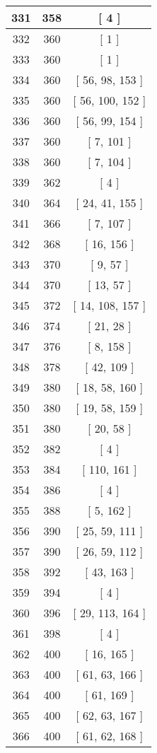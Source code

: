 \begin{center}
\begin{longtable}[H]{|| c c c ||}
331 & 358 & [ 4 ]
\\\hline
332 & 360 & [ 1 ]
\\\hline
333 & 360 & [ 1 ]
\\\hline
334 & 360 & [ 56, 98, 153 ]
\\\hline
335 & 360 & [ 56, 100, 152 ]
\\\hline
336 & 360 & [ 56, 99, 154 ]
\\\hline
337 & 360 & [ 7, 101 ]
\\\hline
338 & 360 & [ 7, 104 ]
\\\hline
339 & 362 & [ 4 ]
\\\hline
340 & 364 & [ 24, 41, 155 ]
\\\hline
341 & 366 & [ 7, 107 ]
\\\hline
342 & 368 & [ 16, 156 ]
\\\hline
343 & 370 & [ 9, 57 ]
\\\hline
344 & 370 & [ 13, 57 ]
\\\hline
345 & 372 & [ 14, 108, 157 ]
\\\hline
346 & 374 & [ 21, 28 ]
\\\hline
347 & 376 & [ 8, 158 ]
\\\hline
348 & 378 & [ 42, 109 ]
\\\hline
349 & 380 & [ 18, 58, 160 ]
\\\hline
350 & 380 & [ 19, 58, 159 ]
\\\hline
351 & 380 & [ 20, 58 ]
\\\hline
352 & 382 & [ 4 ]
\\\hline
353 & 384 & [ 110, 161 ]
\\\hline
354 & 386 & [ 4 ]
\\\hline
355 & 388 & [ 5, 162 ]
\\\hline
356 & 390 & [ 25, 59, 111 ]
\\\hline
357 & 390 & [ 26, 59, 112 ]
\\\hline
358 & 392 & [ 43, 163 ]
\\\hline
359 & 394 & [ 4 ]
\\\hline
360 & 396 & [ 29, 113, 164 ]
\\\hline
361 & 398 & [ 4 ]
\\\hline
362 & 400 & [ 16, 165 ]
\\\hline
363 & 400 & [ 61, 63, 166 ]
\\\hline
364 & 400 & [ 61, 169 ]
\\\hline
365 & 400 & [ 62, 63, 167 ]
\\\hline
366 & 400 & [ 61, 62, 168 ]
\\\hline

\end{longtable}
\end{center}
